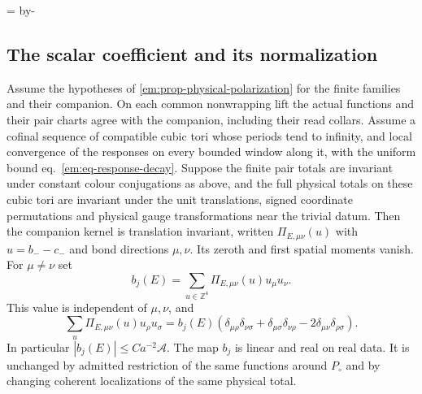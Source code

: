 \documentclass[11pt,letterpaper,reqno]{amsart}
\makeatletter
\numberwithin{equation}{section}
\renewcommand{\eqref}[1]{\textup{eq.~\ref{#1}}}
\newcommand{\emneedspace}[1]{\par\begingroup
  \dimen0=\pagegoal\advance\dimen0 by-\pagetotal
  \ifdim\dimen0<#1\relax\newpage\fi\endgroup}
\theoremstyle{definition}
\newcommand{\ms@minorstart}{%
  \pushQED{\qed}\renewcommand{\qedsymbol}{$\blacksquare$}}
\newenvironment{proposition}[1][]{\ms@minorstart\ms@proposition[#1]}
  {\popQED\endms@proposition}
\theoremstyle{remark}
\makeatother
\begin{document}
\emneedspace{27\baselineskip}
\subsection{The scalar coefficient and its normalization}

\begin{proposition}[The companion coefficient]
\label{em:prop-companion-coefficient}
Assume the hypotheses of \cref{em:prop-physical-polarization} for
the finite families and their companion. On each common nonwrapping
lift the actual functions and their pair charts agree with the
companion, including their read collars. Assume a cofinal sequence
of compatible cubic tori whose periods tend to infinity, and local
convergence of the responses on every
bounded window along it, with the uniform bound
\eqref{em:eq-response-decay}. Suppose the finite pair totals are
invariant under constant colour conjugations as above, and the
full physical totals on
these cubic tori are invariant under the unit translations,
signed coordinate permutations and physical gauge transformations
near the trivial datum. Then the companion kernel is translation
invariant, written $\Pi_{E,\mu\nu}(u)$ with $u=b_--c_-$ and bond
directions $\mu,\nu$. Its zeroth and first spatial moments vanish.
For $\mu\ne\nu$ set
\begin{equation}\label{em:eq-coefficient-moment}
    b_j(E)=\sum_{u\in\mathbb Z^4}\Pi_{E,\mu\nu}(u)u_\mu u_\nu .
\end{equation}
This value is independent of $\mu,\nu$, and
\begin{equation}\label{em:eq-maxwell-moment}
 \sum_u\Pi_{E,\mu\nu}(u)u_\rho u_\sigma
  =b_j(E)(\delta_{\mu\rho}\delta_{\nu\sigma}
      +\delta_{\mu\sigma}\delta_{\nu\rho}
      -2\delta_{\mu\nu}\delta_{\rho\sigma}) .
\end{equation}
In particular $|b_j(E)|\le C a^{-2}\mathcal A$.
The map $b_j$ is linear and real on real data. It is unchanged by
admitted restriction of the same functions around $P_\circ$ and by
changing coherent localizations of the same physical total.
\end{proposition}
\end{document}
